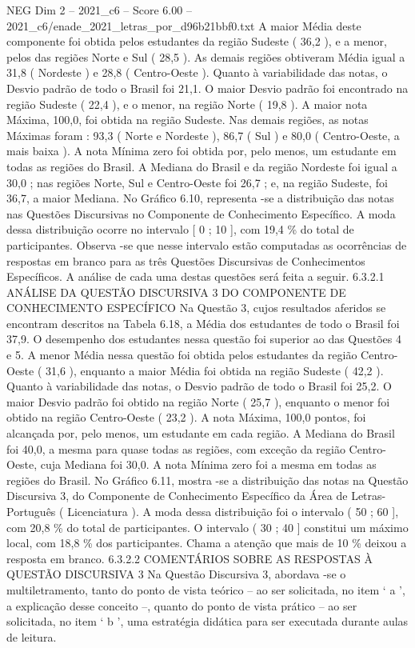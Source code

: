 \begin{textsample}{NEG Dim 2 – 2021\_c6 – Score 6.00 – 2021\_c6/enade\_2021\_letras\_por\_d96b21bbf0.txt}
A maior Média deste componente foi obtida pelos estudantes da região Sudeste ( 36,2 ), e a menor, pelos das regiões Norte e Sul ( 28,5 ).
As demais regiões obtiveram Média igual a 31,8 ( Nordeste ) e 28,8 ( Centro-Oeste ).
Quanto à variabilidade das notas, o Desvio padrão de todo o Brasil foi 21,1.
O maior Desvio padrão foi encontrado na região Sudeste ( 22,4 ), e o menor, na região Norte ( 19,8 ).
A maior nota Máxima, 100,0, foi obtida na região Sudeste.
Nas demais regiões, as notas Máximas foram : 93,3 ( Norte e Nordeste ), 86,7 ( Sul ) e 80,0 ( Centro-Oeste, a mais baixa ).
A nota Mínima zero foi obtida por, pelo menos, um estudante em todas as regiões do Brasil.
A Mediana do Brasil e da região Nordeste foi igual a 30,0 ; nas regiões Norte, Sul e Centro-Oeste foi 26,7 ; e, na região Sudeste, foi 36,7, a maior Mediana.
No Gráfico 6.10, representa -se a distribuição das notas nas Questões Discursivas no Componente de Conhecimento Específico.
A moda dessa distribuição ocorre no intervalo [ 0 ; 10 ], com 19,4 \% do total de participantes.
Observa -se que nesse intervalo estão computadas as ocorrências de respostas em branco para as três Questões Discursivas de Conhecimentos Específicos.
A análise de cada uma destas questões será feita a seguir. 6.3.2.1 ANÁLISE DA QUESTÃO DISCURSIVA 3 DO COMPONENTE DE CONHECIMENTO ESPECÍFICO Na Questão 3, cujos resultados aferidos se encontram descritos na Tabela 6.18, a Média dos estudantes de todo o Brasil foi 37,9.
O desempenho dos estudantes nessa questão foi superior ao das Questões 4 e 5.
A menor Média nessa questão foi obtida pelos estudantes da região Centro-Oeste ( 31,6 ), enquanto a maior Média foi obtida na região Sudeste ( 42,2 ).
Quanto à variabilidade das notas, o Desvio padrão de todo o Brasil foi 25,2.
O maior Desvio padrão foi obtido na região Norte ( 25,7 ), enquanto o menor foi obtido na região Centro-Oeste ( 23,2 ).
A nota Máxima, 100,0 pontos, foi alcançada por, pelo menos, um estudante em cada região.
A Mediana do Brasil foi 40,0, a mesma para quase todas as regiões, com exceção da região Centro-Oeste, cuja Mediana foi 30,0.
A nota Mínima zero foi a mesma em todas as regiões do Brasil.
No Gráfico 6.11, mostra -se a distribuição das notas na Questão Discursiva 3, do Componente de Conhecimento Específico da Área de Letras-Português ( Licenciatura ).
A moda dessa distribuição foi o intervalo ( 50 ; 60 ], com 20,8 \% do total de participantes.
O intervalo ( 30 ; 40 ] constitui um máximo local, com 18,8 \% dos participantes.
Chama a atenção que mais de 10 \% deixou a resposta em branco. 6.3.2.2 COMENTÁRIOS SOBRE AS RESPOSTAS À QUESTÃO DISCURSIVA 3 Na Questão Discursiva 3, abordava -se o multiletramento, tanto do ponto de vista teórico – ao ser solicitada, no item ‘ a ’, a explicação desse conceito –, quanto do ponto de vista prático – ao ser solicitada, no item ‘ b ’, uma estratégia didática para ser executada durante aulas de leitura.

\end{textsample}
